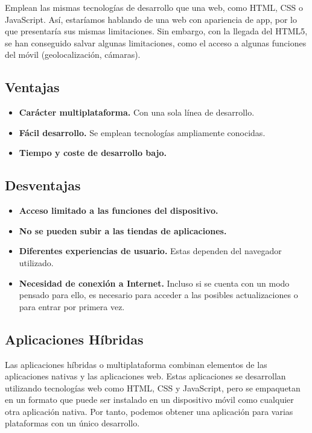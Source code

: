 Emplean las mismas tecnologías de desarrollo que una web, como HTML, CSS o JavaScript. Así, estaríamos hablando de una web con apariencia de app, por lo que presentaría sus mismas limitaciones. Sin embargo, con la llegada del HTML5, se han conseguido salvar algunas limitaciones, como el acceso a algunas funciones del móvil (geolocalización, cámaras).

\subsection*{Ventajas}
\begin{itemize}
	\item \textbf{Carácter multiplataforma.} Con una sola línea de desarrollo.
	\item \textbf{Fácil desarrollo.} Se emplean tecnologías ampliamente conocidas.
	\item \textbf{Tiempo y coste de desarrollo bajo.}
\end{itemize}

\subsection*{Desventajas}
\begin{itemize}
	\item \textbf{Acceso limitado a las funciones del dispositivo.}
	\item \textbf{No se pueden subir a las tiendas de aplicaciones.}
	\item \textbf{Diferentes experiencias de usuario.} Estas dependen del navegador utilizado.
	\item \textbf{Necesidad de conexión a Internet.} Incluso si se cuenta con un modo pensado para ello, es necesario para acceder a las posibles actualizaciones o para entrar por primera vez.
\end{itemize}

\subsection{Aplicaciones Híbridas}

Las aplicaciones híbridas o multiplataforma combinan elementos de las aplicaciones nativas y las aplicaciones web. Estas aplicaciones se desarrollan utilizando tecnologías web como HTML, CSS y JavaScript, pero se empaquetan en un formato que puede ser instalado en un dispositivo móvil como cualquier otra aplicación nativa. Por tanto, podemos obtener una aplicación para varias plataformas con un único desarrollo.

